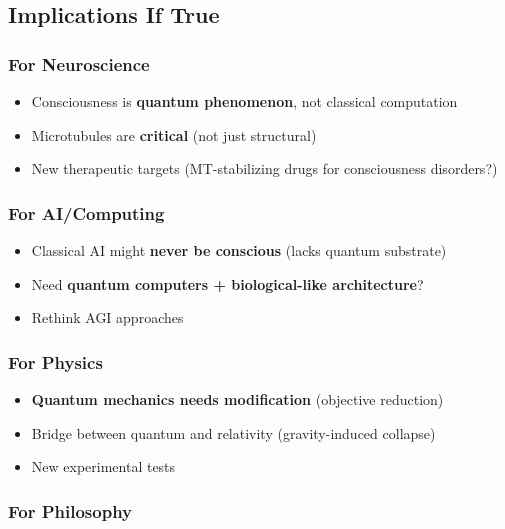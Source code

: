 \subsection{Implications If True}\label{implications-if-true}

\subsubsection{For Neuroscience}\label{for-neuroscience}

\begin{itemize}
\tightlist
\item
  Consciousness is \textbf{quantum phenomenon}, not classical
  computation
\item
  Microtubules are \textbf{critical} (not just structural)
\item
  New therapeutic targets (MT-stabilizing drugs for consciousness
  disorders?)
\end{itemize}

\subsubsection{For AI/Computing}\label{for-aicomputing}

\begin{itemize}
\tightlist
\item
  Classical AI might \textbf{never be conscious} (lacks quantum
  substrate)
\item
  Need \textbf{quantum computers + biological-like architecture}?
\item
  Rethink AGI approaches
\end{itemize}

\subsubsection{For Physics}\label{for-physics}

\begin{itemize}
\tightlist
\item
  \textbf{Quantum mechanics needs modification} (objective reduction)
\item
  Bridge between quantum and relativity (gravity-induced collapse)
\item
  New experimental tests
\end{itemize}

\subsubsection{For Philosophy}\label{for-philosophy}

